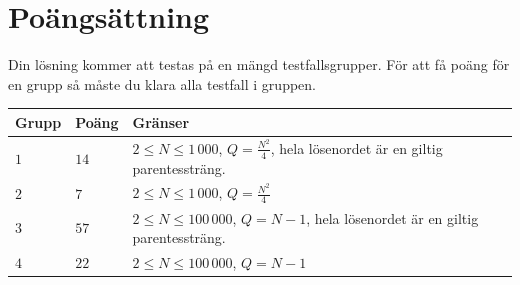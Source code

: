 \section*{Poängsättning}
Din lösning kommer att testas på en mängd testfallsgrupper.
För att få poäng för en grupp så måste du klara alla testfall i gruppen.

\noindent
\begin{tabular}{| l | l | p{12cm} |}
  \hline
  \textbf{Grupp} & \textbf{Poäng} & \textbf{Gränser} \\ \hline
    $1$   & $14$       & $2 \le N \le 1\,000$, $Q = \frac{N^2}{4}$, hela lösenordet är en giltig parentessträng. \\ \hline
    $2$   & $7$        & $2 \le N \le 1\,000$, $Q = \frac{N^2}{4}$ \\ \hline
    $3$   & $57$       & $2 \le N \le 100\,000$, $Q = N - 1$, hela lösenordet är en giltig parentessträng. \\ \hline
    $4$   & $22$       & $2 \le N \le 100\,000$, $Q = N - 1$ \\ \hline
\end{tabular}

